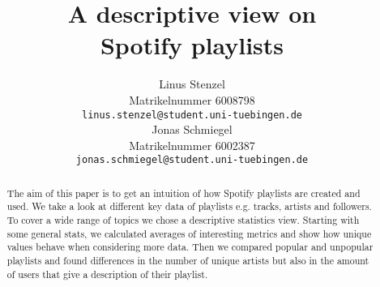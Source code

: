 \documentclass{article}
\title{A descriptive view on\\ Spotify playlists}
\author{
  Linus Stenzel\\
  Matrikelnummer 6008798\\
  \texttt{linus.stenzel@student.uni-tuebingen.de} \\
  \And
  Jonas Schmiegel\\
  Matrikelnummer 6002387\\
  \texttt{jonas.schmiegel@student.uni-tuebingen.de} \\
}
\begin{document}
\maketitle

\begin{abstract}
  The aim of this paper is to get an intuition of how Spotify playlists are created and used. We take a look at different key data of playlists e.g. tracks, artists and followers. To cover a wide range of topics we chose a descriptive statistics view. Starting with some general stats, we calculated averages of interesting metrics and show how unique values behave when considering more data. Then we compared popular and unpopular playlists and found differences in the number of unique artists but also in the amount of users that give a description of their playlist.
  
\end{abstract}








\end{document}
